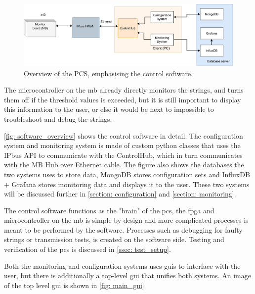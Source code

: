 \documentclass[main.tex]{subfiles}
\begin{document}
\begin{figure}[!htpb]
    \centering
    \includegraphics[width=15cm]{images/PCS overview.pdf}
    \caption{Overview of the PCS, emphasising the control software.}
    \label{fig: software_overview}
\end{figure}
\FloatBarrier



The microcontroller on the \gls{mb} already directly monitors the strings, and turns them off if the threshold values is exceeded, but it is still important to display this information to the user, or else it would be next to impossible to troubleshoot and debug the strings.

\autoref{fig: software_overview} shows the control software in detail. The configuration system and monitoring system is made of custom python classes that uses the IPbus API to communicate with the ControlHub, which in turn communicates with the MB Hub over Ethernet cable. The figure also shows the databases the two systems uses to store data, MongoDB stores configuration sets and InfluxDB + Grafana stores monitoring data and displays it to the user. These two systems will be discussed further in \autoref{section: configuration} and \autoref{section: monitoring}.

The control software functions as the "brain" of the \gls{pcs}, the \gls{fpga} and microcontroller on the \gls{mb} is simple by design and more complicated processes is meant to be performed by the software. Processes such as debugging for faulty strings or transmission tests, is created on the software side. Testing and verification of the \gls{pcs} is discussed in \autoref{ssec: test_setup}.
 

Both the monitoring and configuration systems uses \gls{gui}s to interface with the user, but there is additionally a top-level \gls{gui} that unifies both systems. An image of the top level \gls{gui} is shown in \autoref{fig: main_gui}
\end{document}
